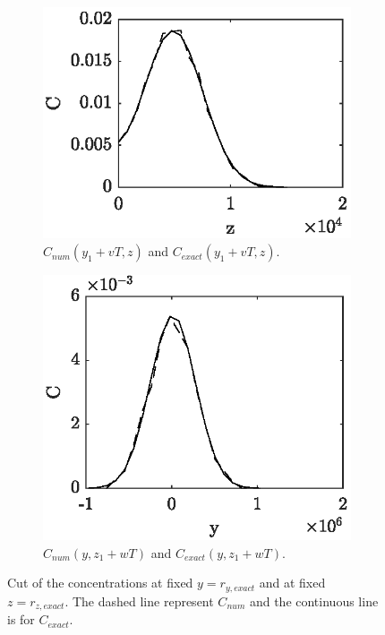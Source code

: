 \begin{figure}[H]
	\centering
	\begin{subfigure}[b]{0.49\textwidth}
		\includegraphics[width=\textwidth]{fig/testcase/testcaseSI_fixedy.eps}
		\caption{$C_{num}(y_1+vT,z)$ and $C_{exact}(y_1+vT,z)$.}
		\label{fig:testcaseSI_fixedy}
	\end{subfigure}
	\begin{subfigure}[b]{0.49\textwidth}
		\includegraphics[width=\textwidth]{fig/testcase/testcaseSI_fixedz.eps}
		\caption{$C_{num}(y,z_1+wT)$ and $C_{exact}(y,z_1+wT)$.}
		\label{fig:testcaseSI_fixedz}
	\end{subfigure}
	\caption{Cut of the concentrations at fixed $y = r_{y,exact}$ and at fixed $z = r_{z,exact}$. The dashed line represent $C_{num}$ and the continuous line is for $C_{exact}$.}
\end{figure}